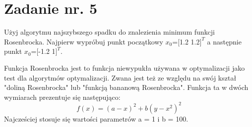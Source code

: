 \documentclass{article}
\begin{document}
\newpage
\section{Zadanie nr. 5}
Użyj algorytmu najszybszego spadku do znalezienia minimum funkcji Rosenbrocka. Najpierw wypróbuj punkt początkowy $x_0$=[1.2 1.2$]^T$
a następnie punkt $x_0$=[-1.2 1$]^T$.

Funkcja Rosenbrocka jest to funkcja niewypukła używana w optymalizacji jako test dla algorytmów optymalizacji.
Zwana jest też ze względu na swój kształ "doliną Rosenbrocka" lub "funkcją bananową Rosenbrocka".
Funkcja ta w dwóch wymiarach prezentuje się następująco:
\begin{equation}
  f(x)= (a - x)^2 + b(y-x^2)^2
\end{equation}
Najcześciej stosuje się wartości parametrów a = 1 i b = 100.
\end{document}

